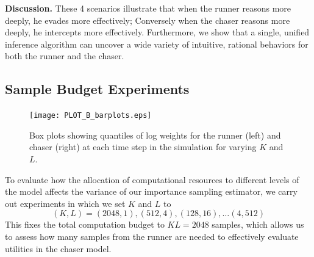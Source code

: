 \documentclass[twoside]{article}
\begin{document}
\textbf{Discussion.} These 4 scenarios illustrate that 
when the runner reasons more deeply, he evades more effectively; Conversely when the chaser reasons more deeply, he intercepts more effectively. Furthermore, we show that a single, unified inference algorithm can uncover a wide variety of intuitive, rational behaviors for both the runner and the chaser. %


\subsection{Sample Budget Experiments}
\vskip -0.05in

\begin{figure}[!t]
\begin{center}
\centerline{\hspace{-0.2em}\texttt{[image: PLOT\_B\_barplots.eps]}}
\caption{Box plots showing quantiles of log weights for the runner (left) and chaser (right) at each time step in the simulation for varying $K$ and $L$.}
\label{fig:box_plots}
\end{center}
\vskip -0.4in
\end{figure} 


To evaluate how the allocation of computational resources to different levels of the model affects the variance of our importance sampling estimator, we carry out experiments in which we set $K$ and $L$ to
\[
    (K,L) = (2048,1), (512, 4), (128, 16), \ldots (4,512)
\]
This fixes the total computation budget to $K L = 2048$ samples, which allows us to assess how many samples from the runner are needed to effectively evaluate utilities in the chaser model.
\end{document}
